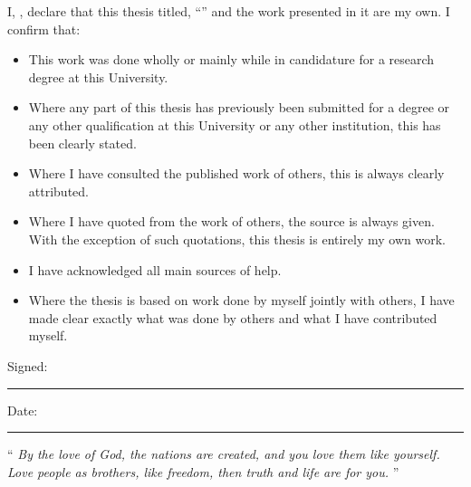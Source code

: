 \documentclass[
12pt, %
oneside, %
english, %
onehalfspacing, %
onehalfspacing, %
headsepline, %
]{MastersDoctoralThesis} %
\begin{document}

\begin{declaration}
\addchaptertocentry{\authorshipname} %
\noindent I, \authorname, declare that this thesis titled, \enquote{\ttitle} and the work presented in it are my own. I confirm that:

\begin{itemize} 
\item This work was done wholly or mainly while in candidature for a research degree at this University.
\item Where any part of this thesis has previously been submitted for a degree or any other qualification at this University or any other institution, this has been clearly stated.
\item Where I have consulted the published work of others, this is always clearly attributed.
\item Where I have quoted from the work of others, the source is always given. With the exception of such quotations, this thesis is entirely my own work.
\item I have acknowledged all main sources of help.
\item Where the thesis is based on work done by myself jointly with others, I have made clear exactly what was done by others and what I have contributed myself.\\
\end{itemize}
 
\noindent Signed:\\
\rule[0.5em]{25em}{0.5pt} %
 
\noindent Date:\\
\rule[0.5em]{25em}{0.5pt} %
\end{declaration}

\cleardoublepage


\vspace*{0.2\textheight}

\noindent\enquote{\itshape 
By the love of God, the nations are created, and you love them like yourself. Love people as brothers, like freedom, then truth and life are for you. 
}
\bigbreak
\end{document}
